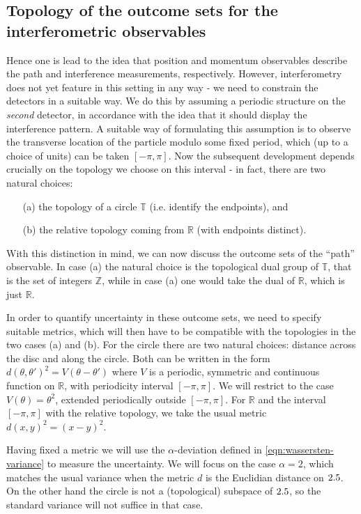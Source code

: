 \subsection{Topology of the outcome sets for the interferometric observables}

Hence one is lead to the idea that position and momentum observables describe the path and interference measurements, respectively. However, interferometry does not yet feature in this setting in any way - we need to constrain the detectors in a suitable way. We do this by assuming a periodic structure on the \emph{second} detector, in accordance with the idea that it should display the interference pattern. A suitable way of formulating this assumption is to observe the transverse location of the particle modulo some fixed period, which (up to a choice of units) can be taken $[-\pi,\pi]$. Now the subsequent development depends crucially on the topology we choose on this interval - in fact, there are two natural choices:
\begin{itemize}
\item[(a)] the topology of a circle $\mathbb T$ (i.e. identify the endpoints), and
\item[(b)] the relative topology coming from $\mathbb R$ (with endpoints distinct).
\end{itemize}
With this distinction in mind, we can now discuss the outcome sets of the ``path'' observable. In case (a) the natural choice is the topological dual group of $\mathbb T$, that is the set of integers $\mathbb Z$, while in case (a) one would take the dual of $\mathbb R$, which is just $\mathbb R$.

In order to quantify uncertainty in these outcome sets, we need to specify suitable metrics, which will then have to be compatible with the topologies in the two cases (a) and (b). For the circle there are two natural choices: distance across the disc and along the circle. Both can be written in the form $d(\theta,\theta')^2 = V(\theta-\theta')$ where $V$ is a periodic, symmetric and continuous function on $\mathbb R$, with periodicity interval $[-\pi,\pi]$. We will restrict to the case $V(\theta) = \theta^2$, extended periodically outside $[-\pi,\pi]$. For $\mathbb R$ and the interval $[-\pi,\pi]$ with the relative topology, we take the usual metric $d(x,y)^2=(x-y)^2$.

Having fixed a metric we will use the $\alpha$-deviation defined in \eqref{eqn:wassersten-variance} to measure the uncertainty. We will focus on the case $\alpha=2$, which matches the usual variance when the metric $d$ is the Euclidian distance on $2.5$. On the other hand the circle is not a (topological) subspace of $2.5$, so the standard variance will not suffice in that case.


